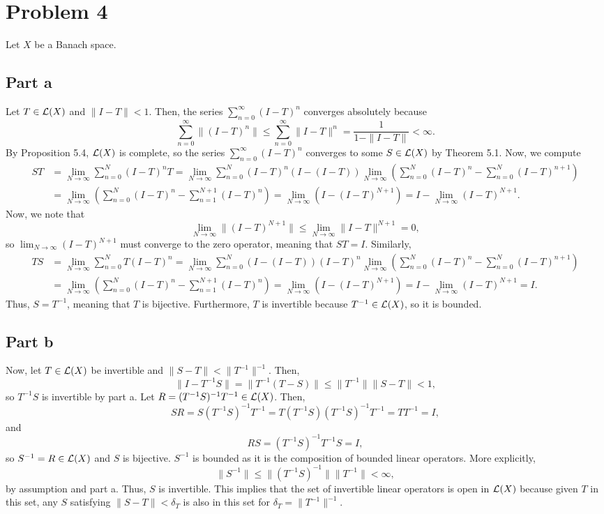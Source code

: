 \documentclass{article}
\begin{document}
\section{Problem 4}
Let $X$ be a Banach space.
\subsection{Part a}
Let $T\in {\cal L}(X)$ and $\|I-T\|<1$. Then, the series $\sum_{n=0}^\infty(I-T)^n$ converges absolutely because
\[
\sum_{n=0}^\infty\|(I-T)^n\|\leq \sum_{n=0}^\infty\|I-T\|^n=\frac{1}{1-\|I-T\|}<\infty.
\]
By Proposition 5.4, ${\cal L}(X)$ is complete, so the series $\sum_{n=0}^\infty(I-T)^n$ converges to some $S\in {\cal L}(X)$ by Theorem 5.1. Now, we compute
\begin{align*}
ST&=\lim_{N\to\infty}\sum_{n=0}^N(I-T)^nT=\lim_{N\to\infty}\sum_{n=0}^N(I-T)^n(I-(I-T))\lim_{N\to\infty}\left(\sum_{n=0}^N(I-T)^{n}-\sum_{n=0}^N(I-T)^{n+1}\right)\\&=
\lim_{N\to\infty}\left(\sum_{n=0}^{N}(I-T)^{n}-\sum_{n=1}^{N+1}(I-T)^{n}\right)=\lim_{N\to\infty}\left(I-(I-T)^{N+1}\right)=I-\lim_{N\to\infty}(I-T)^{N+1}.
\end{align*}
Now, we note that 
\[
\lim_{N\to\infty}\|(I-T)^{N+1}\|\leq\lim_{N\to\infty}\|I-T\|^{N+1}=0,
\]
so $\lim_{N\to\infty}(I-T)^{N+1}$ must converge to the zero operator, meaning that $ST=I$. Similarly, 
\begin{align*}
	TS&=\lim_{N\to\infty}\sum_{n=0}^NT(I-T)^n=\lim_{N\to\infty}\sum_{n=0}^N(I-(I-T))(I-T)^n\lim_{N\to\infty}\left(\sum_{n=0}^N(I-T)^{n}-\sum_{n=0}^N(I-T)^{n+1}\right)\\&=
	\lim_{N\to\infty}\left(\sum_{n=0}^{N}(I-T)^{n}-\sum_{n=1}^{N+1}(I-T)^{n}\right)=\lim_{N\to\infty}\left(I-(I-T)^{N+1}\right)=I-\lim_{N\to\infty}(I-T)^{N+1}=I.
\end{align*}
Thus, $S=T^{-1}$, meaning that $T$ is bijective. Furthermore, $T$ is invertible because $T^{-1}\in{\cal L}(X)$, so it is bounded.

\subsection{Part b}
Now, let $T\in{\cal L}(X)$ be invertible and $\|S-T\|<\|T^{-1}\|^{-1}$. Then,
\[
\|I-T^{-1}S\|=\|T^{-1}(T-S)\|\leq\|T^{-1}\|\|S-T\|<1,
\]
so $T^{-1}S$ is invertible by part a. Let $R=(T^{-1}S)^{-1}T^{-1}\in {\cal L}(X)$. Then,
\[
SR=S(T^{-1}S)^{-1}T^{-1}=T(T^{-1}S)(T^{-1}S)^{-1}T^{-1}=TT^{-1}=I,
\]
and 
\[
RS=(T^{-1}S)^{-1}T^{-1}S=I,
\]
so $S^{-1}=R\in {\cal L}(X)$ and $S$ is bijective. $S^{-1}$ is bounded as it is the composition of bounded linear operators. More explicitly,
\[
\|S^{-1}\|\leq\|(T^{-1}S)^{-1}\|\|T^{-1}\|<\infty,
\]
by assumption and part a. Thus, $S$ is invertible. This implies that the set of invertible linear operators is open in ${\cal L}(X)$ because given $T$ in this set, any $S$ satisfying $\|S-T\|<\delta_T$ is also in this set for $\delta_T=\|T^{-1}\|^{-1}$.
\end{document}
